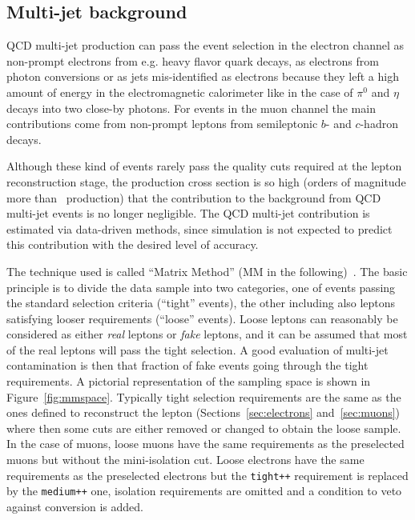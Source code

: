



\subsection{Multi-jet background}\label{sec:qcdbkg}

QCD multi-jet production can pass the event selection in the electron
channel as non-prompt electrons from e.g. heavy flavor quark decays, as 
electrons from photon conversions or as jets mis-identified as electrons
because they left a high amount of energy in the electromagnetic calorimeter
like in the case of $\pi^0$ and $\eta$ decays into two close-by photons.
For events in the muon channel the main contributions come from
non-prompt leptons from semileptonic $b$- and $c$-hadron decays.

Although these kind of events rarely pass the quality cuts 
required at the lepton reconstruction stage, the production cross section
is so high (orders  of magnitude more than \ttbar\ production)
that the contribution to the background from QCD multi-jet events is
no longer negligible. The QCD multi-jet contribution
is estimated via data-driven 
methods, since simulation is not expected to predict this contribution
with the desired level of accuracy.

The technique used is called ``Matrix Method'' (MM in the following)~\cite{ttbar_3pb}.  
The basic principle is to divide the data sample into two categories, one
of events passing the standard selection criteria (``tight'' events), the
other including also leptons satisfying looser requirements (``loose'' events).
Loose leptons can reasonably  be considered as either {\it real} leptons or {\it fake} leptons,
and it can be assumed that most of the real leptons will pass the tight selection. 
A good evaluation of multi-jet contamination is then that fraction of fake events going
through the tight requirements. A pictorial representation of the sampling space 
is shown in Figure~\ref{fig:mmspace}. Typically tight selection requirements
are the same as the ones defined to reconstruct the lepton (Sections~\ref{sec:electrons}
and~\ref{sec:muons}) where then some cuts are either removed or changed
to obtain the loose sample. In the case of muons, loose muons have the same
requirements as the preselected  
muons but without the mini-isolation cut. Loose electrons  have the same
requirements as the preselected  
electrons but the \texttt{tight++} requirement is replaced
by the \texttt{medium++} one, isolation requirements are omitted and
a condition to veto against conversion is added.

